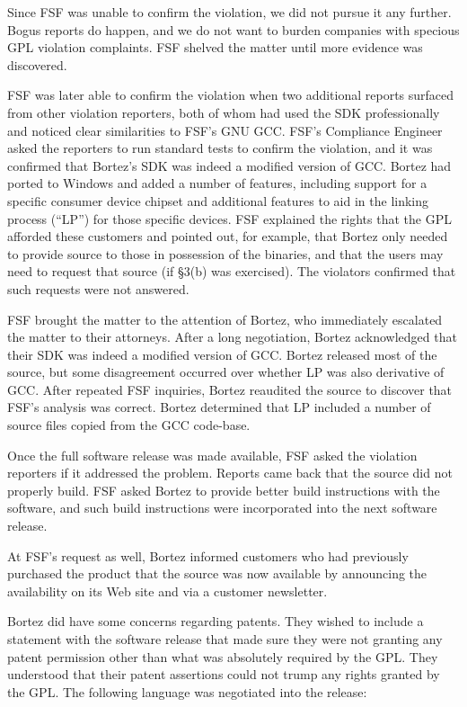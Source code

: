Since FSF was unable to confirm the violation, we did not pursue it any
further. Bogus reports do happen, and we do not want to burden companies
with specious GPL violation complaints. FSF shelved the matter until
more evidence was discovered.

FSF was later able to confirm the violation when two additional reports
surfaced from other violation reporters, both of whom had used the SDK
professionally and noticed clear similarities to FSF's GNU GCC\@. FSF's
Compliance Engineer asked the reporters to run standard tests to confirm
the violation, and it was confirmed that Bortez's SDK was indeed a
modified version of GCC\@. Bortez had ported to Windows and added a number
of features, including support for a specific consumer device chipset and
additional features to aid in the linking process (``LP'') for those
specific devices. FSF explained the rights that the GPL afforded these
customers and pointed out, for example, that Bortez only needed to provide
source to those in possession of the binaries, and that the users may need
to request that source (if \S 3(b) was exercised). The violators
confirmed that such requests were not answered.

FSF brought the matter to the attention of Bortez, who immediately
escalated the matter to their attorneys. After a long negotiation,
Bortez acknowledged that their SDK was indeed a modified version of
GCC\@. Bortez released most of the source, but some disagreement
occurred over whether LP was also derivative of GCC\@. After repeated
FSF inquiries, Bortez reaudited the source to discover that FSF's
analysis was correct. Bortez determined that LP included a number of
source files copied from the GCC code-base.

\label{davrik-build-problems}
Once the full software release was made available, FSF asked the violation
reporters if it addressed the problem. Reports came back that the source
did not properly build. FSF asked Bortez to provide better build
instructions with the software, and such build instructions were
incorporated into the next software release.

At FSF's request as well, Bortez informed customers who had previously
purchased the product that the source was now available by announcing
the availability on its Web site and via a customer newsletter.

Bortez did have some concerns regarding patents. They wished to include a
statement with the software release that made sure they were not granting
any patent permission other than what was absolutely required by the GPL\@.
They understood that their patent assertions could not trump any rights
granted by the GPL\@. The following language was negotiated into the release:

